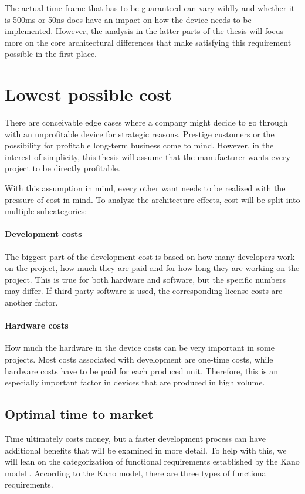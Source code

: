 The actual time frame that has to be guaranteed can vary wildly and whether it is 500ms or 50ns does have an impact on how the device needs to be implemented. However, the analysis in the latter parts of the thesis will focus more on the core architectural differences that make satisfying this requirement possible in the first place. 

\section{Lowest possible cost}
There are conceivable edge cases where a company might decide to go through with an unprofitable device for strategic reasons. Prestige customers or the possibility for profitable long-term business come to  mind. However, in the interest of simplicity, this thesis will assume that the manufacturer wants every project to be directly profitable.

With this assumption in mind, every other want needs to be realized with the pressure of cost in mind. To analyze the architecture effects, cost will be split into multiple subcategories:
\paragraph{Development costs}
The biggest part of the development cost is based on how many developers work on the project, how  much they are paid and for how long they are working on the project. This is true for both hardware and software, but the specific numbers may differ. If third-party software is used, the corresponding license costs are another factor. 
\paragraph{Hardware costs}
How much the hardware in the device costs can be very important in some projects. Most costs associated with development are one-time costs, while hardware costs have to be paid for each produced unit. Therefore, this is an especially important factor in devices that are produced in high volume.

\subsection{Optimal time to market \label{optimal-ttm}}
Time ultimately costs money, but a faster development process can have additional benefits that will be examined in more detail. To help with this, we will lean on the categorization of functional requirements established by the Kano model \cite{sauerwein1996kano}. According to the Kano model, there are three types of functional requirements.
